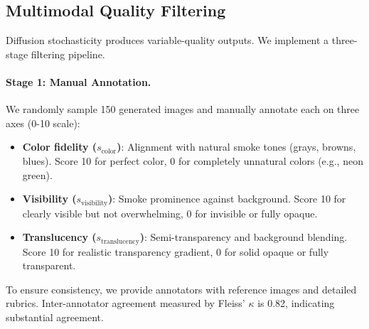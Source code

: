 \documentclass[journal]{IEEEtran}
\begin{document}
\subsection{Multimodal Quality Filtering}

Diffusion stochasticity produces variable-quality outputs. We implement a three-stage filtering pipeline.

\paragraph{Stage 1: Manual Annotation.}
We randomly sample 150 generated images and manually annotate each on three axes (0-10 scale):
\begin{itemize}
    \item \textbf{Color fidelity ($s_{\text{color}}$)}: Alignment with natural smoke tones (grays, browns, blues). Score 10 for perfect color, 0 for completely unnatural colors (e.g., neon green).
    \item \textbf{Visibility ($s_{\text{visibility}}$)}: Smoke prominence against background. Score 10 for clearly visible but not overwhelming, 0 for invisible or fully opaque.
    \item \textbf{Translucency ($s_{\text{translucency}}$)}: Semi-transparency and background blending. Score 10 for realistic transparency gradient, 0 for solid opaque or fully transparent.
\end{itemize}

To ensure consistency, we provide annotators with reference images and detailed rubrics. Inter-annotator agreement measured by Fleiss' $\kappa$ is 0.82, indicating substantial agreement.
\end{document}
